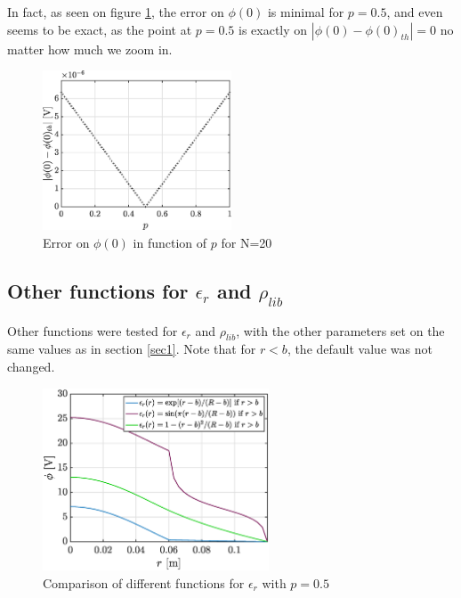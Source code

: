 \documentclass[a4paper,12pt,twoside]{article}
\begin{document}
      In fact, as seen on figure \ref{econv}, the error on $\phi(0)$ is minimal for $p=0.5$, and even seems to be exact, as the point at $p=0.5$ is exactly on $|\phi(0)-\phi(0)_{th}|=0$ no matter how much we zoom in.
      \begin{figure}[h]
      \centering
       \includegraphics[width=0.5\textwidth]{graphs/e_conv.eps}
       \caption{Error on $\phi(0)$ in function of $p$ for N=20}
       \label{econv}
      \end{figure}
      
      
      \subsection{Other functions for $\epsilon_r$ and $\rho_{lib}$}
      
      Other functions were tested for $\epsilon_r$ and $\rho_{lib}$, with the other parameters set on the same values as in section \ref{sec1}. Note that for $r<b$, the default value was not changed.

      \begin{figure}[h]
      \centering
       \includegraphics[width=0.6\textwidth]{graphs/eepsr.eps}
       \caption{Comparison of different functions for $\epsilon_r$ with $p=0.5$}
       \label{eepsr}
      \end{figure}
\end{document}
